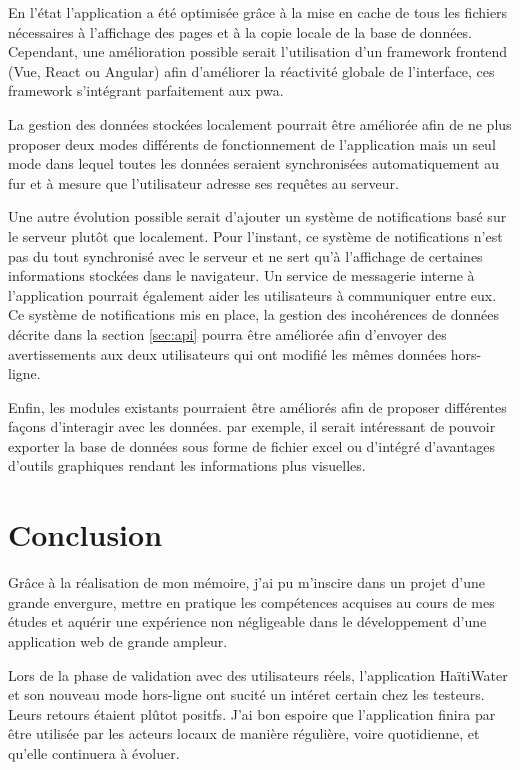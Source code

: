 \documentclass{EPL-master-thesis-covers-FR}
\begin{document}
			En l'état l'application a été optimisée grâce à la mise en cache de tous les fichiers nécessaires à l'affichage des pages et à la copie locale de la base de données. Cependant, une amélioration possible serait l'utilisation d'un \gls{framework} frontend (Vue, React ou Angular) afin d'améliorer la réactivité globale de l'interface, ces \gls{framework} s'intégrant parfaitement aux \gls{pwa}.
			
			La gestion des données stockées localement pourrait être améliorée afin de ne plus proposer deux modes différents de fonctionnement de l'application mais un seul mode dans lequel toutes les données seraient synchronisées automatiquement au fur et à mesure que l'utilisateur adresse ses requêtes au serveur.
			
			Une autre évolution possible serait d'ajouter un système de notifications basé sur le serveur plutôt que localement. Pour l'instant, ce système de notifications n'est pas du tout synchronisé avec le serveur et ne sert qu'à l'affichage de certaines informations stockées dans le navigateur. Un service de messagerie interne à l'application pourrait également aider les utilisateurs à communiquer entre eux. Ce système de notifications mis en place, la gestion des incohérences de données décrite dans la section \ref{sec:api} pourra être améliorée afin d'envoyer des avertissements aux deux utilisateurs qui ont modifié les mêmes données hors-ligne.
		
			Enfin, les modules existants pourraient être améliorés afin de proposer différentes façons d'interagir avec les données. par exemple, il serait intéressant de pouvoir exporter la base de données sous forme de fichier excel ou d'intégré d'avantages d'outils graphiques rendant les informations plus visuelles.




	\chapter{Conclusion}
		Grâce à la réalisation de mon mémoire, j'ai pu m'inscire dans un projet d'une grande envergure, mettre en pratique les compétences acquises au cours de mes études et aquérir une expérience non négligeable dans le développement d'une application web de grande ampleur.
		
		Lors de la phase de validation avec des utilisateurs réels, l'application HaïtiWater et son nouveau mode hors-ligne ont sucité un intéret certain chez les testeurs. Leurs retours étaient plûtot positfs. J'ai bon espoire que l'application finira par être utilisée par les acteurs locaux de manière régulière, voire quotidienne, et qu'elle continuera à évoluer.
		
\end{document}
